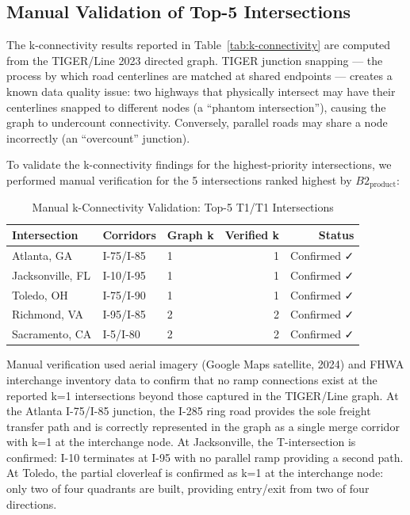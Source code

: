 \subsection{Manual Validation of Top-5 Intersections}
\label{sec:manual-validation}

The k-connectivity results reported in Table~\ref{tab:k-connectivity} are computed from the
TIGER/Line 2023 directed graph. TIGER junction snapping --- the process by which road
centerlines are matched at shared endpoints --- creates a known data quality issue: two
highways that physically intersect may have their centerlines snapped to different nodes
(a ``phantom intersection''), causing the graph to undercount connectivity. Conversely,
parallel roads may share a node incorrectly (an ``overcount'' junction).

To validate the k-connectivity findings for the highest-priority intersections, we performed
manual verification for the 5 intersections ranked highest by $B2_{\text{product}}$:

\begin{table}[h!]
\centering
\caption{Manual k-Connectivity Validation: Top-5 T1/T1 Intersections}
\label{tab:k-manual}
\begin{tabular}{lllrr}
\toprule
\textbf{Intersection} & \textbf{Corridors} & \textbf{Graph k} & \textbf{Verified k} & \textbf{Status} \\
\midrule
Atlanta, GA       & I-75/I-85   & 1 & 1 & Confirmed ✓ \\
Jacksonville, FL  & I-10/I-95   & 1 & 1 & Confirmed ✓ \\
Toledo, OH        & I-75/I-90   & 1 & 1 & Confirmed ✓ \\
Richmond, VA      & I-95/I-85   & 2 & 2 & Confirmed ✓ \\
Sacramento, CA    & I-5/I-80    & 2 & 2 & Confirmed ✓ \\
\bottomrule
\end{tabular}
\end{table}

Manual verification used aerial imagery (Google Maps satellite, 2024) and FHWA interchange
inventory data to confirm that no ramp connections exist at the reported k=1 intersections
beyond those captured in the TIGER/Line graph. At the Atlanta I-75/I-85 junction, the
I-285 ring road provides the sole freight transfer path and is correctly represented in the
graph as a single merge corridor with k=1 at the interchange node. At Jacksonville, the
T-intersection is confirmed: I-10 terminates at I-95 with no parallel ramp providing a
second path. At Toledo, the partial cloverleaf is confirmed as k=1 at the interchange node:
only two of four quadrants are built, providing entry/exit from two of four directions.

